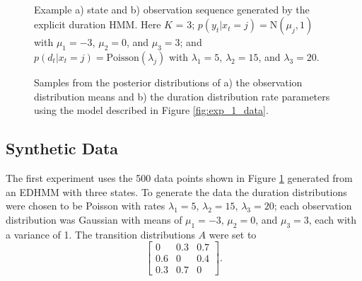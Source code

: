 
\begin{figure}
     \\
    \caption{Example a) state and b) observation sequence generated by the explicit duration HMM. Here $K$ = 3; $p(y_t|x_t=j) = \mathrm{N}(\mu_j, 1)$ with $\mu_1 = -3$, $\mu_2 = 0$, and $\mu_3 = 3$; and $p(d_t|x_t=j) = \mathrm{Poisson}(\lambda_j)$ with $\lambda_1 = 5$, $\lambda_2 = 15$, and $\lambda_3 = 20$.}
    \label{fig:experiment1_data}
\end{figure}

\begin{figure}
    \caption{Samples from the posterior distributions of a) the observation distribution means and b) the duration distribution rate parameters using the model described in Figure \ref{fig:exp_1_data}.}
    \label{fig:experiment1_results}
\end{figure}
\subsection{Synthetic Data}

The first experiment uses the 500 data points shown in Figure \ref{fig:experiment1_data} generated from an EDHMM with three states. To generate the data the duration distributions were chosen to be Poisson with rates $\lambda_1 = 5$, $\lambda_2 = 15$, $\lambda_3 = 20$; each observation distribution was Gaussian with means of $\mu_1 = -3$, $\mu_2 = 0$, and $\mu_3 = 3$, each with a variance of 1. The transition distributions $A$ were set to
\begin{equation*}
\begin{bmatrix}
    0 & 0.3 & 0.7 \\ 0.6 & 0 & 0.4 \\ 0.3 & 0.7 & 0
\end{bmatrix}.  
\end{equation*}



